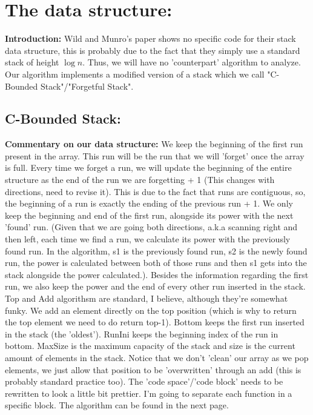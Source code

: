 \documentclass{article}
\begin{document}
\section{The data structure:}
\textbf{Introduction:} Wild and Munro's paper shows no specific code for their stack data structure,
this is probably due to the fact that they simply use a standard stack of height $\log n$.
Thus, we will have no 'counterpart' algorithm to analyze. Our algorithm implements a modified version of a stack which
we call "C-Bounded Stack"/"Forgetful Stack".

\subsection{C-Bounded Stack:}
\noindent\textbf{Commentary on our data structure:} We keep the beginning of the first run present in the array.
This run will be the run that we will 'forget' once the array is full. Every time we forget a run, we will 
update the beginning of the entire structure as the end of the run we are forgetting + 1 (This changes with directions, need to revise it). This is 
due to the fact that runs are contiguous, so, the beginning of a run is exactly the ending of the previous run + 1.
We only keep the beginning and end of the first run, alongside its power with the next 'found' run. (Given that
we are going both directions, a.k.a scanning right and then left, each time we find a run, we calculate its power with the previously found run.
In the algorithm, s1 is the previously found run, s2 is the newly found run, the power is calculated between both of those runs and then s1 gets into the stack alongside the power calculated.).
Besides the information regarding the first run, we also keep the power and the end of every other run inserted in the stack. 
Top and Add algorithsm are standard, I believe, although they're somewhat funky. We add an element directly on the top position (which is why to return the top element we need to do return top-1).
Bottom keeps the first run inserted in the stack (the 'oldest'). RunIni keeps the beginning index of the run in bottom.
MaxSize is the maximum capacity of the stack and size is the current amount of elements in the stack. Notice that we don't 'clean' our array
as we pop elements, we just allow that position to be 'overwritten' through an add (this is probably standard practice too).
The 'code space'/'code block' needs to be rewritten to look a little bit prettier. I'm going to separate each function in a specific block. The algorithm can be found in the next page.
\newpage
\end{document}
